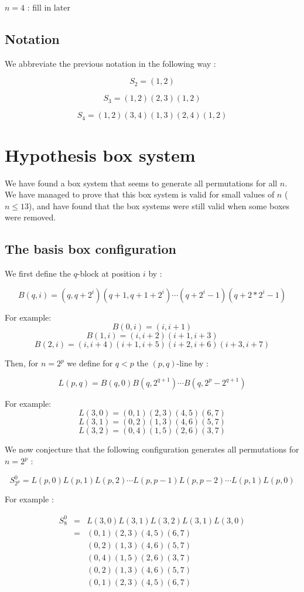 \documentclass[11pt, a4paper]{article}
\begin{document}
$n=4$ : fill in later

\subsection {Notation}

We abbreviate the previous notation in the following way :

$$S_2 = (1,2)$$

$$S_3 = (1,2)(2,3)(1,2)$$

$$S_4 = (1,2)(3,4)(1,3)(2,4)(1,2)$$

\section{Hypothesis box system}

We have found a box system that seems to generate all permutations for all $n$.
We have managed to prove that this box system is valid for small values of $n$
($n \leq 13$), and have found that the box systems were still valid when some
boxes were removed.

\subsection{The basis box configuration}

We first define the $q$-block at position $i$ by :

$$B(q,i) = (q,q+2^i)(q+1,q+1+2^i)\cdots(q+2^i-1)(q+2*2^i-1)$$

For example: 
$$B(0,i) = (i,i+1)$$
$$B(1,i) = (i, i+2)(i+1, i+3)$$
$$B(2, i) = (i,i+4)(i+1,i+5)(i+2,i+6)(i+3,i+7)$$

Then, for $n=2^p$ we define for $q < p$ the $(p,q)$-line by :

$$L(p,q) = B(q,0) B(q,2^{q+1}) \cdots B(q,2^p-2^{q+1})$$

For example:
$$L(3,0) = (0,1)(2,3)(4,5)(6,7)$$
$$L(3,1) = (0,2)(1,3)(4,6)(5,7)$$
$$L(3,2) = (0,4)(1,5)(2,6)(3,7)$$

We now conjecture that the following configuration generates all permutations
for $n=2^p$ :

$$S_{2^p}^0 = L(p,0) L(p,1) L(p,2) \cdots L(p,p-1) L(p,p-2) \cdots L(p,1) L(p,0)$$

For example :

$$
\begin{aligned}
	S_8^0 & = & L(3,0) L(3,1) L(3,2) L(3,1) L(3,0) \\
        & = & (0,1)(2,3)(4,5)(6,7) \\
		& & (0,2)(1,3)(4,6)(5,7) \\
		& & (0,4)(1,5)(2,6)(3,7) \\
		& & (0,2)(1,3)(4,6)(5,7) \\
        & & (0,1)(2,3)(4,5)(6,7)
\end{aligned}$$
\end{document}
